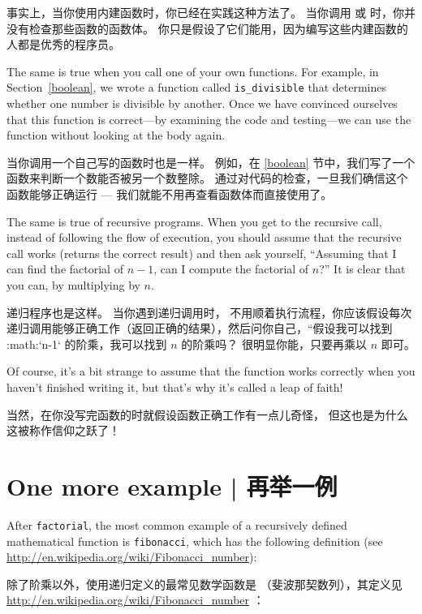 事实上，当你使用内建函数时，你已经在实践这种方法了。
当你调用  或  时，你并没有检查那些函数的函数体。
你只是假设了它们能用，因为编写这些内建函数的人都是优秀的程序员。

The same is true when you call one of your own functions.  For
example, in Section~\ref{boolean}, we wrote a function called
\verb"is_divisible" that determines whether one number is divisible by
another.  Once we have convinced ourselves that this function is
correct---by examining the code and testing---we can use the function
without looking at the body again.

当你调用一个自己写的函数时也是一样。
例如，在 \ref{boolean} 节中，我们写了一个  函数来判断一个数能否被另一个数整除。
通过对代码的检查，一旦我们确信这个函数能够正确运行 --- 我们就能不用再查看函数体而直接使用了。

The same is true of recursive programs.  When you get to the recursive
call, instead of following the flow of execution, you should assume
that the recursive call works (returns the correct result) and then ask
yourself, ``Assuming that I can find the factorial of $n-1$, can I
compute the factorial of $n$?''  It is clear that you
can, by multiplying by $n$.

递归程序也是这样。
当你遇到递归调用时， 不用顺着执行流程，你应该假设每次递归调用能够正确工作（返回正确的结果），然后问你自己，“假设我可以找到 :math:`n-1` 的阶乘，我可以找到 $n$ 的阶乘吗？
很明显你能，只要再乘以 $n$ 即可。

Of course, it's a bit strange to assume that the function works
correctly when you haven't finished writing it, but that's why
it's called a leap of faith!

当然，在你没写完函数的时就假设函数正确工作有一点儿奇怪， 但这也是为什么这被称作信仰之跃了！


\section{One more example  |  再举一例}
\label{one.more.example}

  
After {\tt factorial}, the most common example of a recursively
defined mathematical function is {\tt fibonacci}, which has the
following definition (see
  \url{http://en.wikipedia.org/wiki/Fibonacci_number}):

除了阶乘以外，使用递归定义的最常见数学函数是  （斐波那契数列），其定义见 \url{http://en.wikipedia.org/wiki/Fibonacci_number} ：

